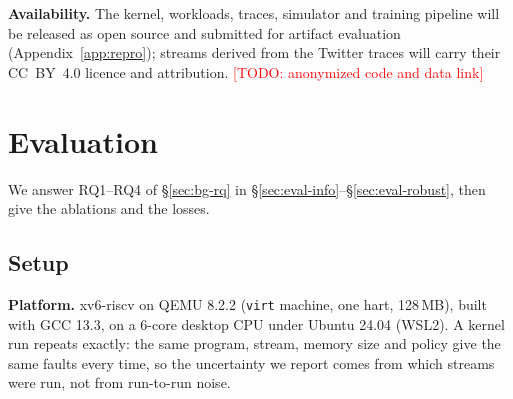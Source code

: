 \documentclass{article}
\newcommand{\xv}{xv6-riscv\xspace}
\newcommand{\todo}[1]{\textcolor{red}{[TODO: #1]}}
\newcommand{\finding}[1]{\textbf{#1}\hspace{0.4em}}
\begin{document}
\finding{Availability.} The kernel, workloads, traces, simulator and training pipeline
will be released as open source and submitted for artifact evaluation
(Appendix~\ref{app:repro}); streams derived
from the Twitter traces will carry their CC~BY~4.0 licence and attribution.
\todo{anonymized code and data link}
\section{Evaluation}
\label{sec:eval}

We answer RQ1--RQ4 of \S\ref{sec:bg-rq} in \S\ref{sec:eval-info}--\S\ref{sec:eval-robust},
then give the ablations and the losses.

\subsection{Setup}
\label{sec:eval-setup}

\finding{Platform.} \xv on QEMU 8.2.2 (\texttt{virt} machine, one hart, 128\,MB), built
with GCC 13.3, on a 6-core desktop CPU under Ubuntu 24.04 (WSL2). A kernel run repeats exactly:
the same program, stream, memory size and policy give the same faults every time, so the
uncertainty we report comes from which streams were run, not from run-to-run noise.
\end{document}
